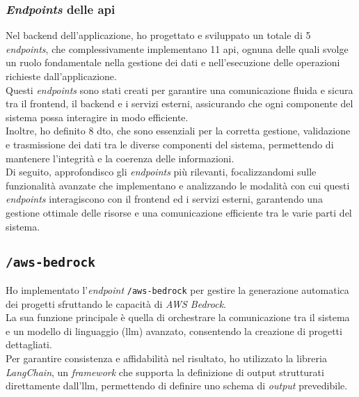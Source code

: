 \subsubsection{\textit{Endpoints} delle \gls{api}}

\noindent Nel \gls{backend} dell'applicazione, ho progettato e sviluppato un totale di 5 \textit{endpoints}, che complessivamente implementano 11 \gls{api}, ognuna delle quali svolge un ruolo fondamentale nella gestione dei dati e nell'esecuzione delle operazioni richieste dall'applicazione. \\
Questi \textit{endpoints} sono stati creati per garantire una comunicazione fluida e sicura tra il \gls{frontend}, il \gls{backend} e i servizi esterni, assicurando che ogni componente del sistema possa interagire in modo efficiente.\\
Inoltre, ho definito 8 \gls{dto}, che sono essenziali per la corretta gestione, validazione e trasmissione dei dati tra le diverse componenti del sistema, permettendo di mantenere l'integrità e la coerenza delle informazioni.\\

\noindent Di seguito, approfondisco gli \textit{endpoints} più rilevanti, focalizzandomi sulle funzionalità avanzate che implementano e analizzando le modalità con cui questi \textit{endpoints} interagiscono con il \gls{frontend} ed i servizi esterni, garantendo una gestione ottimale delle risorse e una comunicazione efficiente tra le varie parti del sistema. \\

\subsection*{\texttt{/aws-bedrock}}
Ho implementato l’\textit{endpoint} \texttt{/aws-bedrock} per gestire la generazione automatica dei progetti sfruttando le capacità di \textit{AWS Bedrock}.\\
La sua funzione principale è quella di orchestrare la comunicazione tra il sistema e un modello di linguaggio (\gls{llm}) avanzato, consentendo la creazione di progetti dettagliati.\\

\noindent Per garantire consistenza e affidabilità nel risultato, ho utilizzato la libreria \textit{LangChain}, un \textit{framework} che supporta la definizione di output strutturati direttamente dall’\gls{llm},
permettendo di definire uno schema di \textit{output} prevedibile.\\


